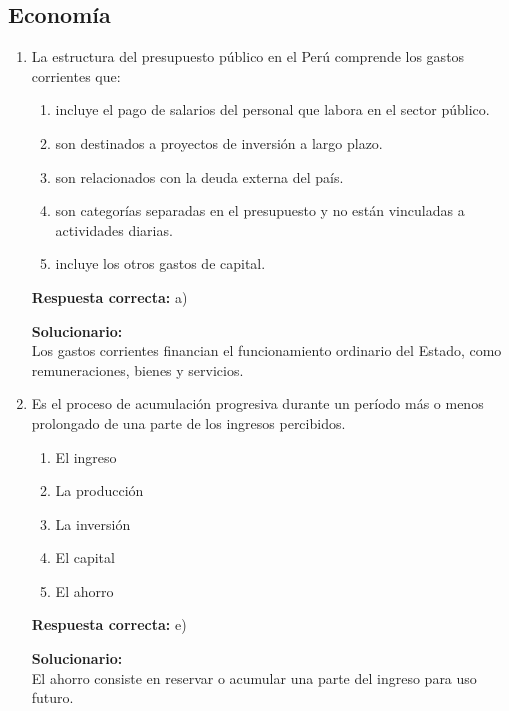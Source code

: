 \subsection*{Economía}

\begin{enumerate}
	
	\item La estructura del presupuesto público en el Perú comprende los gastos corrientes que:
	\begin{enumerate}[label=\alph*)]
		\item incluye el pago de salarios del personal que labora en el sector público.
		\item son destinados a proyectos de inversión a largo plazo.
		\item son relacionados con la deuda externa del país.
		\item son categorías separadas en el presupuesto y no están vinculadas a actividades diarias.
		\item incluye los otros gastos de capital.
	\end{enumerate}
	\textbf{Respuesta correcta:} a)
	
	\vspace{2mm}
	\textbf{Solucionario:}\\
	Los gastos corrientes financian el funcionamiento ordinario del Estado, como remuneraciones, bienes y servicios.
	
	\vspace{6mm}
	
	\item Es el proceso de acumulación progresiva durante un período más o menos prolongado de una parte de los ingresos percibidos.
	\begin{enumerate}[label=\alph*)]
		\item El ingreso
		\item La producción
		\item La inversión
		\item El capital
		\item El ahorro
	\end{enumerate}
	\textbf{Respuesta correcta:} e)
	
	\vspace{2mm}
	\textbf{Solucionario:}\\
	El ahorro consiste en reservar o acumular una parte del ingreso para uso futuro.
	
	\vspace{6mm}
	
\end{enumerate}

